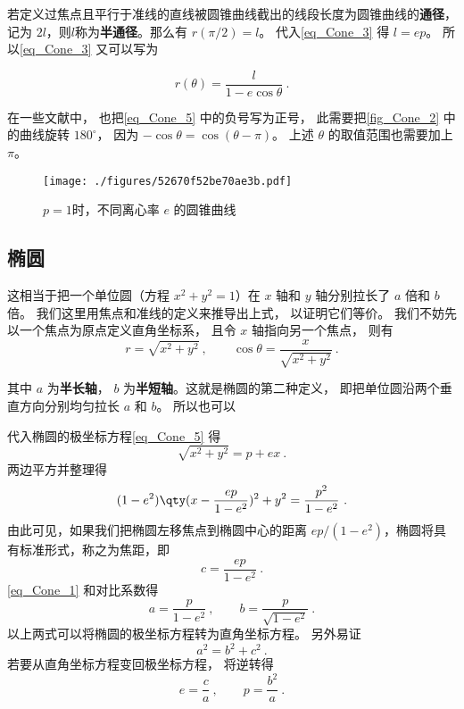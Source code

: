 若定义过焦点且平行于准线的直线被圆锥曲线截出的线段长度为圆锥曲线的\textbf{通径}，记为 $2l$，则$l$称为\textbf{半通径}。那么有 $r(\pi /2) = l$。 代入\autoref{eq_Cone_3} 得 $l = ep$。 所以\autoref{eq_Cone_3} 又可以写为

\begin{equation}\label{eq_Cone_5}
r(\theta)  = \frac{l}{1 - e\cos \theta }~.
\end{equation}

在一些文献中， 也把\autoref{eq_Cone_5} 中的负号写为正号， 此需要把\autoref{fig_Cone_2} 中的曲线旋转 $180^\circ$， 因为 $-\cos\theta = \cos(\theta - \pi)$。 上述 $\theta$ 的取值范围也需要加上 $\pi$。


\begin{figure}[ht]
\centering
\texttt{[image: ./figures/52670f52be70ae3b.pdf]}
\caption{$p = 1$时，不同离心率 $e$ 的圆锥曲线} \label{fig_Cone_2}
\end{figure}



\subsection{椭圆}

这相当于把一个单位圆（方程 $x^2 + y^2 = 1$）在 $x$ 轴和 $y$ 轴分别拉长了 $a$ 倍和 $b$ 倍。 我们这里用焦点和准线的定义来推导出上式， 以证明它们等价。 我们不妨先以一个焦点为原点定义直角坐标系， 且令 $x$ 轴指向另一个焦点， 则有
\begin{equation}
r = \sqrt{x^2 + y^2}~, \qquad \cos\theta = \frac{x}{\sqrt{x^2 + y^2}}~.
\end{equation}

其中 $a$ 为\textbf{半长轴}， $b$ 为\textbf{半短轴}。这就是椭圆的第二种定义， 即把单位圆沿两个垂直方向分别均匀拉长 $a$ 和 $b$。 所以也可以

代入椭圆的极坐标方程\autoref{eq_Cone_5}  得
\begin{equation}
\sqrt{x^2 + y^2} = p + ex~.
\end{equation}
两边平方并整理得
\begin{equation}\label{eq_Cone_1}
(1 - e^2) \qty( x - \frac{ep}{1 - e^2} )^2 + y^2 = \frac{p^2}{1 - e^2}~.
\end{equation}
由此可见，如果我们把椭圆左移焦点到椭圆中心的距离 $ep/(1 - e^2)$，椭圆将具有标准形式，称之为焦距，即
\begin{equation}
c = \frac{ep}{1 - e^2}~.
\end{equation}
\autoref{eq_Cone_1}  和对比系数得
\begin{equation}
a = \frac{p}{1 - e^2}~, \qquad b = \frac{p}{\sqrt {1 - e^2} }~.
\end{equation}
以上两式可以将椭圆的极坐标方程转为直角坐标方程。 另外易证
\begin{equation}
a^2 = b^2 + c^2~.
\end{equation}
若要从直角坐标方程变回极坐标方程， 将逆转得
\begin{equation}\label{eq_Cone_4}
e = \frac{c}{a}~,\qquad
p = \frac{b^2}{a}~.
\end{equation}

